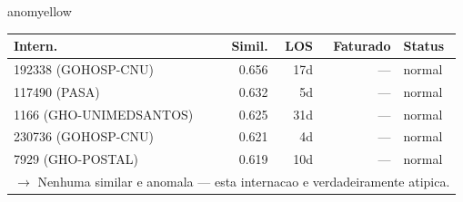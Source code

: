 \documentclass[a4paper,10pt]{article}
\begin{document}
\begin{anomalycard}[Internacao 1361 | GHO-CASSI | MODERADO (z=2.22)]{anomyellow}
\begin{tabular}{l r r r l}\toprule\textbf{Intern.} & \textbf{Simil.} & \textbf{LOS} & \textbf{Faturado} & \textbf{Status} \\\midrule
192338 (GOHOSP-CNU) & 0.656 & 17d & --- & \textcolor{jcubeblue}{normal} \\
117490 (PASA) & 0.632 & 5d & --- & \textcolor{jcubeblue}{normal} \\
1166 (GHO-UNIMEDSANTOS) & 0.625 & 31d & --- & \textcolor{jcubeblue}{normal} \\
230736 (GOHOSP-CNU) & 0.621 & 4d & --- & \textcolor{jcubeblue}{normal} \\
7929 (GHO-POSTAL) & 0.619 & 10d & --- & \textcolor{jcubeblue}{normal} \\
\multicolumn{5}{l}{\textcolor{jcubeblue}{\small $\rightarrow$ Nenhuma similar e anomala --- esta internacao e verdadeiramente atipica.}} \\
\bottomrule\end{tabular}



\end{anomalycard}
\end{document}
